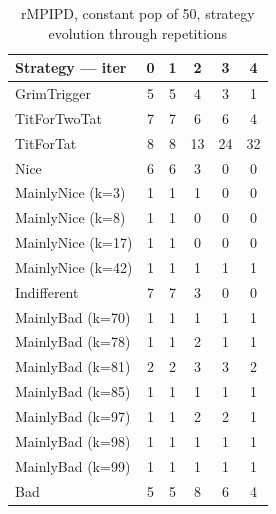 \documentclass[journal,a4paper,10pt,twoside]{IEEEtran} %
\begin{document}
\begin{table}[ht]
	\caption{rMPIPD, constant pop of 50, strategy evolution through repetitions}
	\label{tab:ripdmp-const}
	\centering
    \begin{tabular}{l|ccccc} \toprule
    	Strategy --- iter & 0 & 1 & 2  & 3  & 4  \\ \midrule
    	GrimTrigger       & 5 & 5 & 4  & 3  & 1  \\
    	TitForTwoTat      & 7 & 7 & 6  & 6  & 4  \\
    	TitForTat         & 8 & 8 & 13 & 24 & 32 \\
    	Nice              & 6 & 6 & 3  & 0  & 0  \\
    	MainlyNice (k=3)  & 1 & 1 & 1  & 0  & 0  \\
    	MainlyNice (k=8)  & 1 & 1 & 0  & 0  & 0  \\
    	MainlyNice (k=17) & 1 & 1 & 0  & 0  & 0  \\
    	MainlyNice (k=42) & 1 & 1 & 1  & 1  & 1  \\
    	Indifferent       & 7 & 7 & 3  & 0  & 0  \\
    	MainlyBad (k=70)  & 1 & 1 & 1  & 1  & 1  \\
    	MainlyBad (k=78)  & 1 & 1 & 2  & 1  & 1  \\
    	MainlyBad (k=81)  & 2 & 2 & 3  & 3  & 2  \\
    	MainlyBad (k=85)  & 1 & 1 & 1  & 1  & 1  \\
    	MainlyBad (k=97)  & 1 & 1 & 2  & 2  & 1  \\
    	MainlyBad (k=98)  & 1 & 1 & 1  & 1  & 1  \\
    	MainlyBad (k=99)  & 1 & 1 & 1  & 1  & 1  \\
    	Bad               & 5 & 5 & 8  & 6  & 4  \\ \bottomrule
    \end{tabular}
\end{table}
\end{document}
